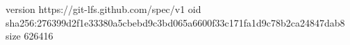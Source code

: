 version https://git-lfs.github.com/spec/v1
oid sha256:276399d2f1e33380a5cbebd9c3bd065a6600f33c171fa1d9c78b2ca24847dab8
size 626416
